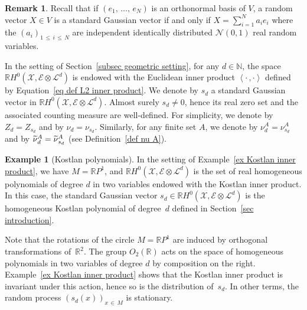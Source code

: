 \documentclass[10pt]{amsart}
\theoremstyle{definition}\newtheorem{defi}[theo]{Definition}\newtheorem{rema}[theo]{Remark}\newtheorem{exam}[theo]{Example}\newtheorem{exem}[theo]{Example}\newtheorem{nota}[theo]{Notation}
\newcommand{\E}{\mathcal{E}}
\newcommand{\X}{\mathcal{X}}
\renewcommand{\L}{\mathcal{L}}
\newcommand{\clN}{\mathcal{N}}
\newcommand{\N}{\mathbb{N}}
\newcommand{\R}{\mathbb{R}}
\newcommand{\prsc}[2]{\left\langle #1\,, #2 \right\rangle}
\renewcommand{\H}{H^0(\X,\E \otimes \L^d)}
\renewcommand{\leq}{\leqslant}
\renewcommand{\tilde}{\widetilde}
\let\oldtilde\tilde
\renewcommand*{\tilde}[1]{\mathchoice{\widetilde{#1}}{\widetilde{#1}}{\oldtilde{#1}}{\oldtilde{#1}}}
\begin{document}
\begin{rema}
Recall that if $(e_1,\,\dots,\,e_N)$ is an orthonormal basis of $V$, a random vector $X \in V$ is a standard Gaussian vector if and only if $X = \sum_{i=1}^N a_i e_i$ where the $(a_i)_{1\,\leq\,i\,\leq\,N}$ are independent identically distributed $\clN(0,1)$ real random variables.
\end{rema}

In the setting of Section~\ref{subsec geometric setting}, for any $d \in \N$, the space $\R\H$ is endowed with the Euclidean inner product $\prsc{\cdot}{\cdot}$ defined by Equation~\eqref{eq def L2 inner product}. We denote by $s_d$ a standard Gaussian vector in $\R\H$. Almost surely $s_d \neq 0$, hence its real zero set and the associated counting measure are well-defined. For simplicity, we denote by $Z_d = Z_{s_d}$ and by $\nu_d = \nu_{s_d}$. Similarly, for any finite set $A$, we denote by $\nu_d^A = \nu^A_{s_d}$ and by $\tilde{\nu}^A_d = \tilde{\nu}^A_{s_d}$ (see Definition~\ref{def nu A}).

\begin{exam}[{Kostlan polynomials}]\label{ex Kostlan polynomials}
In the setting of Example~\ref{ex Kostlan inner product}, we have $M=\R P^1$, and $\R\H$ is the set of real homogeneous polynomials of degree $d$ in two variables endowed with the Kostlan inner product. In this case, the standard Gaussian vector $s_d \in \R\H$ is the homogeneous Kostlan polynomial of degree~$d$ defined in Section~\ref{sec introduction}.

Note that the rotations of the circle $M=\R P^1$ are induced by orthogonal transformations of~$\R^2$. The group $O_2(\R)$ acts on the space of homogeneous polynomials in two variables of degree $d$ by composition on the right. Example~\ref{ex Kostlan inner product} shows that the Kostlan inner product is invariant under this action, hence so is the distribution of~$s_d$. In other terms, the random process $(s_d(x))_{x\,\in\,M}$ is stationary.
\end{exam}
\end{document}

